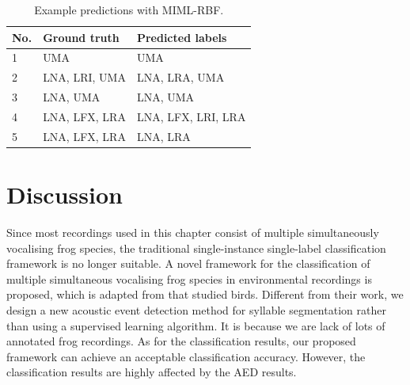 \begin{table}[htb!]
\centering
\caption{Example predictions with MIML-RBF.}
\label{tab:prediction}
\begin{tabular}{lll}
\hline\hline
{\bf No.} &{\bf Ground truth} & {\bf Predicted labels} \\ \hline
1&UMA                & UMA                    \\ 
2&LNA, LRI, UMA      & LNA, LRA, UMA          \\ 
3&LNA, UMA           & LNA, UMA               \\ 
4&LNA, LFX, LRA      & LNA, LFX, LRI, LRA     \\ 
5&LNA, LFX, LRA      & LNA, LRA               \\ \hline\hline
\end{tabular}
\end{table}



\section{Discussion}
Since most recordings used in this chapter consist of multiple simultaneously vocalising frog species, the traditional single-instance single-label classification framework is no longer suitable. A novel framework for the classification of multiple simultaneous vocalising frog species in environmental recordings is proposed, which is adapted from    \cite{briggs2012acoustic} that studied birds. Different from their work, we design a new acoustic event detection method for syllable segmentation rather than using a supervised learning algorithm. It is because we are lack of lots of annotated frog recordings. As for the classification results, our proposed framework can achieve an acceptable classification accuracy. However, the classification results are highly affected by the AED results. 


